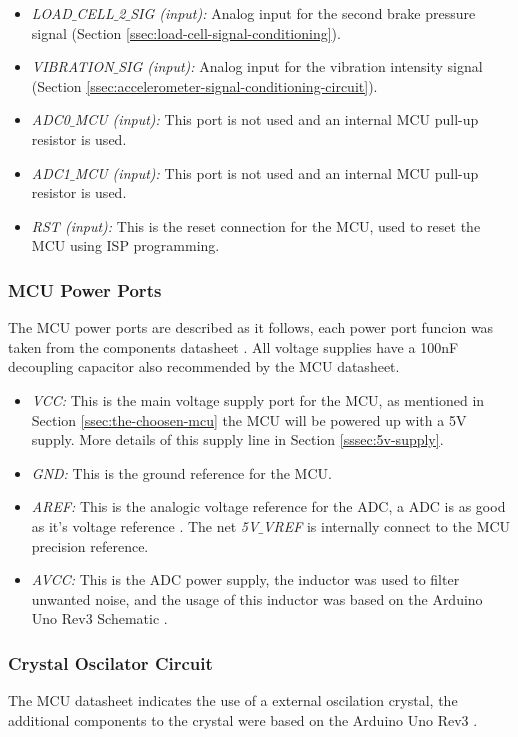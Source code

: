 \begin{itemize}
					\item \textit{LOAD$\_$CELL$\_$2$\_$SIG (input):} Analog input for the second brake pressure signal (Section \ref{ssec:load-cell-signal-conditioning}).\label{itm:mcu-port-load-cell-2-sig} 
					\item \textit{VIBRATION$\_$SIG (input):} Analog input for the vibration intensity signal (Section \ref{ssec:accelerometer-signal-conditioning-circuit}).\label{itm:mcu-port-vibration-sig}
					\item \textit{ADC0$\_$MCU (input):} This port is not used and an internal MCU pull-up resistor is used.\label{itm:mcu-port-adc0-mcu}
					\item \textit{ADC1$\_$MCU (input):} This port is not used and an internal MCU pull-up resistor is used.\label{itm:mcu-port-adc1-mcu}
					\item \textit{RST (input):} This is the reset connection for the MCU, used to reset the MCU using ISP programming.\label{itm:mcu-port-rst}
				\end{itemize}
		
			\subsubsection{MCU Power Ports}\label{sssec:mcu-power-ports}
				The MCU power ports are described as it follows, each power port funcion was taken from the components datasheet \cite{atmega328p-datasheet}. All voltage supplies have a 100nF decoupling capacitor also recommended by the MCU datasheet.

				\begin{itemize}
					\item \textit{VCC: } This is the main voltage supply port for the MCU, as mentioned in Section \ref {ssec:the-choosen-mcu} the MCU will be powered up with a 5V supply. More details of this supply line in Section \ref{sssec:5v-supply}.\label{itm:mcu-vcc}
					\item \textit{GND: } This is the ground reference for the MCU.\label{itm:mcu-gnd}
					\item \textit{AREF: } This is the analogic voltage reference for the ADC, a ADC is as good as it's voltage reference \cite{adc-good}. The net \textit{5V$\_$VREF} is internally connect to the MCU precision reference.
					\item \textit{AVCC: } This is the ADC power supply, the inductor was used to filter unwanted noise, and the usage of this inductor was based on the Arduino Uno Rev3 Schematic \cite{arduino-rev3-schematic}.\label{mcu-avcc}
				\end{itemize}

			\subsubsection{Crystal Oscilator Circuit}\label{sssec:mcu-crystal-oscilator}

				The MCU datasheet indicates the use of a external oscilation crystal, the additional components to the crystal were based on the Arduino Uno Rev3 \cite{arduino-rev3-schematic}.